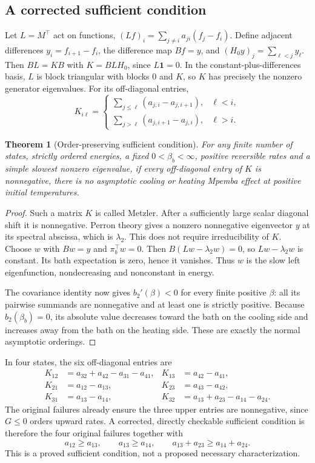 \documentclass[11pt]{article}
\newtheorem{theorem}{Theorem}
\begin{document}
\subsection{A corrected sufficient condition}
Let $L=M^\top$ act on functions, $(Lf)_i=\sum_{j\ne i}a_{ji}(f_j-f_i)$. Define adjacent differences $y_i=f_{i+1}-f_i$, the difference map $Bf=y$, and $(H_0y)_j=\sum_{\ell<j}y_\ell$. Then $BL=KB$ with $K=BLH_0$, since $L\mathbf1=0$. In the constant-plus-differences basis, $L$ is block triangular with blocks 0 and $K$, so $K$ has precisely the nonzero generator eigenvalues. For its off-diagonal entries,
\[
K_{i\ell}=\begin{cases}
\sum_{j\leq\ell}(a_{j,i}-a_{j,i+1}),&\ell<i,\\
\sum_{j>\ell}(a_{j,i+1}-a_{j,i}),&\ell>i.
\end{cases}
\]
\begin{theorem}[Order-preserving sufficient condition]
For any finite number of states, strictly ordered energies, a fixed $0<\beta_b<\infty$, positive reversible rates and a simple slowest nonzero eigenvalue, if every off-diagonal entry of $K$ is nonnegative, there is no asymptotic cooling or heating Mpemba effect at positive initial temperatures.
\end{theorem}
\begin{proof}
Such a matrix $K$ is called Metzler. After a sufficiently large scalar diagonal shift it is nonnegative. Perron theory gives a nonzero nonnegative eigenvector $y$ at its spectral abscissa, which is $\lambda_2$. This does not require irreducibility of $K$. Choose $w$ with $Bw=y$ and $\pi_b^\top w=0$. Then $B(Lw-\lambda_2w)=0$, so $Lw-\lambda_2w$ is constant. Its bath expectation is zero, hence it vanishes. Thus $w$ is the slow left eigenfunction, nondecreasing and nonconstant in energy.

The covariance identity now gives $b_2'(\beta)<0$ for every finite positive $\beta$: all its pairwise summands are nonnegative and at least one is strictly positive. Because $b_2(\beta_b)=0$, its absolute value decreases toward the bath on the cooling side and increases away from the bath on the heating side. These are exactly the normal asymptotic orderings.
\end{proof}
In four states, the six off-diagonal entries are
\begin{align*}
K_{12}&=a_{32}+a_{42}-a_{31}-a_{41},&K_{13}&=a_{42}-a_{41},\\
K_{21}&=a_{12}-a_{13},&K_{23}&=a_{43}-a_{42},\\
K_{31}&=a_{13}-a_{14},&K_{32}&=a_{13}+a_{23}-a_{14}-a_{24}.
\end{align*}
The original failures already ensure the three upper entries are nonnegative, since $G\leq0$ orders upward rates. A corrected, directly checkable sufficient condition is therefore the four original failures together with
\[
a_{12}\geq a_{13},\qquad a_{13}\geq a_{14},\qquad
 a_{13}+a_{23}\geq a_{14}+a_{24}.
\]
This is a proved sufficient condition, not a proposed necessary characterization.
\end{document}
